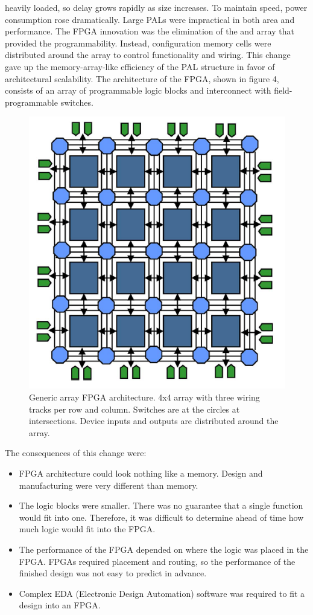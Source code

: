 heavily loaded, so delay grows rapidly as size increases. To maintain speed, power consumption rose dramatically. Large PALs were
impractical in both area and performance.
\newline
The FPGA innovation was the elimination of the and array that provided the programmability. Instead, configuration
memory cells were distributed around the array to control functionality and wiring. This change gave up the
memory-array-like efficiency of the PAL structure in favor of architectural scalability. The architecture of the FPGA,
shown in figure 4, consists of an array of programmable logic blocks and interconnect with field-programmable switches.
\begin{figure}[H]
	\centering
	\includegraphics[width=0.7\linewidth]{IMG/ch3/FPGA}
	\caption{Generic array FPGA architecture. 4x4 array with three wiring
		tracks per row and column. Switches are at the circles at intersections.
		Device inputs and outputs are distributed around the array.}
	\label{fig:fpga}
\end{figure}
\noindent The consequences of this change were:
\begin{itemize}
	\item FPGA architecture could look nothing like a memory. Design and manufacturing were very different than memory.
	\item The logic blocks were smaller. There was no guarantee that a single function would fit into one. Therefore, it was difficult to determine ahead of time how much logic would fit into the FPGA.
	\item The performance of the FPGA depended on where the logic was placed in the FPGA. FPGAs required placement and routing, so the performance of the finished design was not easy to predict in advance.
	\item Complex EDA (Electronic Design Automation) software was required to fit a design into an FPGA.
\end{itemize}




